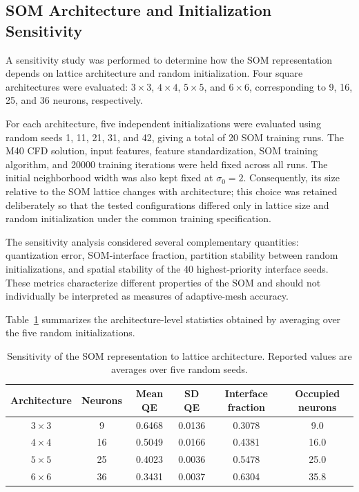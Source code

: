 \subsection{SOM Architecture and Initialization Sensitivity}
\label{sec:som_sensitivity}

A sensitivity study was performed to determine how the SOM representation
depends on lattice architecture and random initialization. Four square
architectures were evaluated: \(3\times3\), \(4\times4\), \(5\times5\),
and \(6\times6\), corresponding to 9, 16, 25, and 36 neurons,
respectively.

For each architecture, five independent initializations were evaluated using
random seeds 1, 11, 21, 31, and 42, giving a total of 20 SOM training runs.
The M40 CFD solution, input features, feature standardization, SOM training
algorithm, and 20000 training iterations were held fixed across all runs.
The initial neighborhood width was also kept fixed at
\(\sigma_0=2\). Consequently, its size relative to the SOM lattice changes
with architecture; this choice was retained deliberately so that the tested
configurations differed only in lattice size and random initialization under
the common training specification.

The sensitivity analysis considered several complementary quantities:
quantization error, SOM-interface fraction, partition stability between
random initializations, and spatial stability of the 40 highest-priority
interface seeds. These metrics characterize different properties of the SOM
and should not individually be interpreted as measures of adaptive-mesh
accuracy.

Table~\ref{tab:som_architecture_sensitivity} summarizes the architecture-level
statistics obtained by averaging over the five random initializations.

\begin{table}[htbp]
\centering
\caption{Sensitivity of the SOM representation to lattice architecture.
Reported values are averages over five random seeds.}
\label{tab:som_architecture_sensitivity}
\begin{tabular}{cccccc}
\hline
Architecture & Neurons & Mean QE & SD QE & Interface fraction & Occupied neurons \\
\hline
\(3\times3\) & 9  & 0.6468 & 0.0136 & 0.3078 & 9.0 \\
\(4\times4\) & 16 & 0.5049 & 0.0166 & 0.4381 & 16.0 \\
\(5\times5\) & 25 & 0.4023 & 0.0036 & 0.5478 & 25.0 \\
\(6\times6\) & 36 & 0.3431 & 0.0037 & 0.6304 & 35.8 \\
\hline
\end{tabular}
\end{table}

